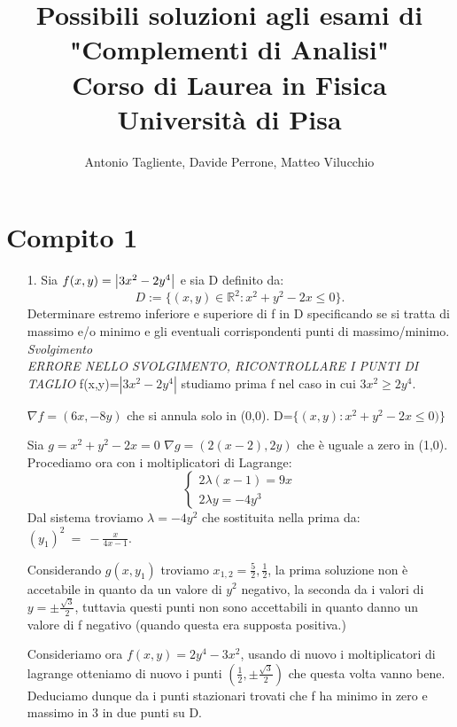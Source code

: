 \documentclass[a4paper]{article}
\author{Antonio Tagliente, Davide Perrone, Matteo Vilucchio}
\title{Possibili soluzioni agli esami di "Complementi di Analisi"\\Corso di Laurea in Fisica\\ Università di Pisa}
\begin{document}
\maketitle
\section*{Compito 1}
\begin{itemize}
\item [1.]
Sia $f (x, y) = \abs{3x^{2}-2y^{4}}$ e sia D definito da:
\begin{equation*}
D:=\{(x, y)\in \mathbb{R}^{2} : x^{2} + y^{2} - 2x \leq 0\}.
\end{equation*}
Determinare estremo inferiore e superiore di f in D specificando se si tratta di
massimo e/o minimo e gli eventuali corrispondenti punti di massimo/minimo.\\
\emph{Svolgimento}\\
\emph{ERRORE NELLO SVOLGIMENTO, RICONTROLLARE I PUNTI DI TAGLIO}
f(x,y)=$ | 3x^2-2y^4|$
studiamo prima f nel caso in cui $3x^2 \ge 2y^4$.

$\nabla f=(6x,-8y)$ che si annula solo in (0,0).
D=$\{(x,y):x^2+y^2-2x \le 0)\}$

Sia $ g= x^2+y^2-2x=0$
$ \nabla g=(2(x-2),2y)$ che è uguale a zero in (1,0).
Procediamo ora con i moltiplicatori di Lagrange:
\begin{equation}
\begin{cases} 
 2\lambda (x-1)=9x\\2\lambda y=-4y^3 
\end{cases}
 \end{equation}
 Dal sistema troviamo $ \lambda=-4y^2$ che sostituita nella prima da: $ (y_1)^{2}~=~-\frac{x}{4x-1}$.
 
Considerando $g(x,y_1)$ troviamo $ x_{1,2}=\frac{5}{2},\frac{1}{2} $, la prima soluzione non è accetabile in quanto da un valore di $y^2$ negativo, la seconda da i valori di $ y=\pm \frac{\sqrt{3}}{2} $, tuttavia questi punti non sono accettabili in quanto danno un valore di f negativo (quando questa era supposta positiva.)


Consideriamo ora $f(x,y)=2y^4-3x^2$, usando di nuovo i moltiplicatori di lagrange otteniamo di nuovo i punti $ (\frac{1}{2}  , \pm \frac{\sqrt{3}}{2} )$ che questa volta vanno bene.
Deduciamo dunque da i punti stazionari trovati che f ha minimo in zero e massimo in 3 in due punti  su D.





\end{itemize}
\end{document}
